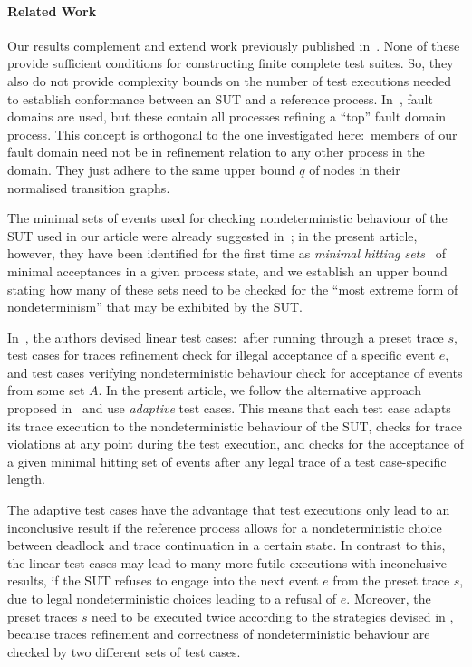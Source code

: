 \documentclass[3p,times]{elsarticle}
\begin{document}
\paragraph{Related Work}
Our results complement and extend work previously published
in~\cite{Hennessy:1988:ATP:50497,DBLP:conf/fm/PeleskaS96,peleska1997a,DBLP:conf/icfem/CavalcantiG07,DBLP:conf/pts/CavalcantiS17}.
None of these provide sufficient conditions for constructing finite complete
test suites. So, they also do not provide complexity bounds on the number of
test executions needed to establish conformance between an SUT and a
reference process. In~\cite{DBLP:conf/pts/CavalcantiS17}, fault domains are
used, but these contain all processes refining a ``top'' fault domain
process. This concept is orthogonal to the one investigated here:~members of
our fault domain need not be in refinement relation to any other process in
the domain. They just adhere to the same upper bound $q$ of nodes in their
normalised transition graphs.

The minimal sets of events used for checking nondeterministic behaviour of the SUT used in our article were already suggested in~\cite{DBLP:conf/fm/PeleskaS96,peleska1997a,DBLP:conf/icfem/CavalcantiG07}; in the present article, however, they have been identified for the first time as {\it minimal hitting sets}~\cite{5533149} of minimal acceptances in a given process state, and we establish an upper bound stating how many of these sets need to be checked for the ``most extreme form of nondeterminism'' that may be exhibited by the SUT.

In~\cite{Hennessy:1988:ATP:50497,DBLP:conf/icfem/CavalcantiG07,DBLP:conf/pts/CavalcantiS17},
the authors devised linear test cases:~after running through a preset trace
$s$, test cases for traces refinement check for illegal acceptance of a
specific event $e$, and test cases verifying  nondeterministic behaviour
check for  acceptance of events from some set $A$. In the present article, we
follow the alternative approach proposed
in~\cite{DBLP:conf/fm/PeleskaS96,peleska1997a} and use {\it adaptive} test
cases. This means that each test case adapts its trace execution to the
nondeterministic behaviour of the SUT, checks for trace violations at any
point during the test execution, and checks for the acceptance of a given
minimal hitting set of events after any legal trace of a test case-specific
length.

The adaptive test cases have the advantage that test executions only lead to
an inconclusive result if the reference process allows for a nondeterministic
choice between deadlock and trace continuation in a certain state. In
contrast to this, the linear test cases may lead to many more futile
executions with inconclusive results, if the SUT refuses to engage into the
next event $e$ from the preset trace $s$, due to legal nondeterministic
choices leading to a refusal of $e$. Moreover, the preset traces $s$ need to
be executed twice according to the strategies devised in
\cite{Hennessy:1988:ATP:50497,DBLP:conf/icfem/CavalcantiG07,DBLP:conf/pts/CavalcantiS17},
because traces refinement and correctness of nondeterministic behaviour are
checked by two different sets of test cases.
\end{document}
